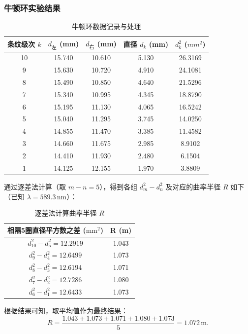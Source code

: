\documentclass[]{../../templates/Report}%
\begin{document}
\begin{fullreportonly}
\subsubsection{牛顿环实验结果}
\begin{table}[H]
  \centering
  \caption{牛顿环数据记录与处理}
  \begin{tabular}{ccccc}
    \toprule
    条纹级次 $k$ & $d_{\text{左}}$ (mm) & $d_{\text{右}}$ (mm) & 直径 $d_k$ (mm) & $d_k^2$ ($mm^2$) \\
    \midrule
    10 & 15.740 & 10.610 & 5.130 & 26.3169 \\
    9  & 15.630 & 10.720 & 4.910 & 24.1081 \\
    8  & 15.490 & 10.850 & 4.640 & 21.5296 \\
    7  & 15.340 & 10.995 & 4.345 & 18.8790 \\
    6  & 15.195 & 11.130 & 4.065 & 16.5242 \\
    5  & 15.040 & 11.295 & 3.745 & 14.0250 \\
    4  & 14.855 & 11.470 & 3.385 & 11.4582 \\
    3  & 14.660 & 11.675 & 2.985 & 8.9102 \\
    2  & 14.410 & 11.930 & 2.480 & 6.1504 \\
    1  & 14.125 & 12.155 & 1.970 & 3.8809 \\
    \bottomrule
  \end{tabular}
\end{table}
通过逐差法计算（取 $m-n=5$），得到各组 $d_m^2 - d_n^2$ 及对应的曲率半径 $R$ 如下（已知 $\lambda = 589.3\,\text{nm}$）：
\begin{table}[H]
  \centering
  \caption{逐差法计算曲率半径 $R$}
  \begin{tabular}{cc}
    \toprule
    \textbf{相隔5圈直径平方数之差} ($\text{mm}^2$) & \textbf{R} (m) \\
    \midrule
    $d_{10}^2 - d_5^2 = 12.2919$ & 1.043 \\
    $d_{9}^2 - d_4^2 = 12.6499$ & 1.073 \\
    $d_{8}^2 - d_3^2 = 12.6194$ & 1.071 \\
    $d_{7}^2 - d_2^2 = 12.7286$ & 1.080 \\
    $d_{6}^2 - d_1^2 = 12.6433$ & 1.073 \\
    \bottomrule
  \end{tabular}
\end{table}
根据结果可知，取平均值作为最终结果：
\[\overline{R} = \frac{1.043+1.073+1.071+1.080+1.073}{5} =1.072 \,\text{m}.\]




\end{fullreportonly}
\end{document}
